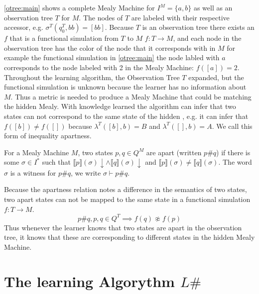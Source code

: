 \autoref{otree:main} shows a complete Mealy Machine for $I^M=\{a,b\}$ as well as an observation tree $T$ for $M$. The nodes of $T$ are labeled with their respective accessor, e.g. $\sigma^T(q_0^T,bb)=[bb]$. Because $T$ is an observation tree there exists an $f$ that is a functional simulation from $T$ to $M$ $f:T\rightarrow M$, and each node in the observation tree has the color of the node that it corresponds with in $M$ for example the functional simulation in \autoref{otree:main} the node labled with $a$ corresponds to the node labeled with 2 in the Mealy Machine: $f([a])=2$.\\
Throughout the learning algorithm, the Observation Tree $T$ expanded, but the functional simulation is unknown because the learner has no information about $M$. Thus a metric is needed to produce a Mealy Machine that could be matching the hidden Mealy. With knowledge learned the algorithm can infer that two states can not correspond to the same state of the hidden , e.g. it can infer that $f([b])\neq f([])$ because $\lambda^T([b],b)=B$ and $\lambda^T([],b)=A$. We call this form of inequality apartness. 
\begin{definition} \label{def:apart}
	For a Mealy Machine $M$, two states $p,q\in Q^M$ are apart (written $p\#q$) if there is some $\sigma\in I^*$ such that $\llbracket p\rrbracket(\sigma)\downarrow\land\llbracket q\rrbracket(\sigma)\downarrow$ and $\llbracket p\rrbracket(\sigma)\neq\llbracket q\rrbracket(\sigma)$. The word $\sigma$ is a witness for $p\#q$, we write $\sigma\vdash p\#q$.
\end{definition}
Because the apartness relation notes a difference in the semantics of two states, two apart states can not be mapped to the same state in a functional simulation $f:T\rightarrow M$. $$
p\#q, p,q\in Q^T\implies f(q)\not\approx f(p)
$$
Thus whenever the learner knows that two states are apart in the observation tree, it knows that these are corresponding to different states in the hidden Mealy Machine.
\section{The learning Algorythm $L\#$}


